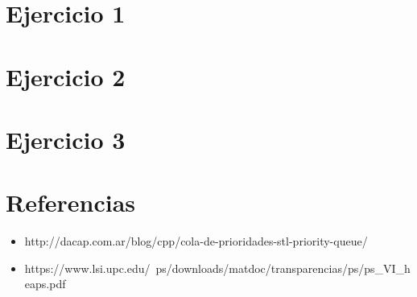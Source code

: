 \documentclass[10pt, a4paper]{article}
\begin{document}
\section{Ejercicio 1}

\newpage

\section{Ejercicio 2}

\newpage

\section{Ejercicio 3}

\newpage

\section{Referencias}

\begin{itemize}
\item http://dacap.com.ar/blog/cpp/cola-de-prioridades-stl-priority-queue/

\item https://www.lsi.upc.edu/~ps/downloads/matdoc/transparencias/ps/ps_VI_heaps.pdf
\end{itemize}
\end{document}

